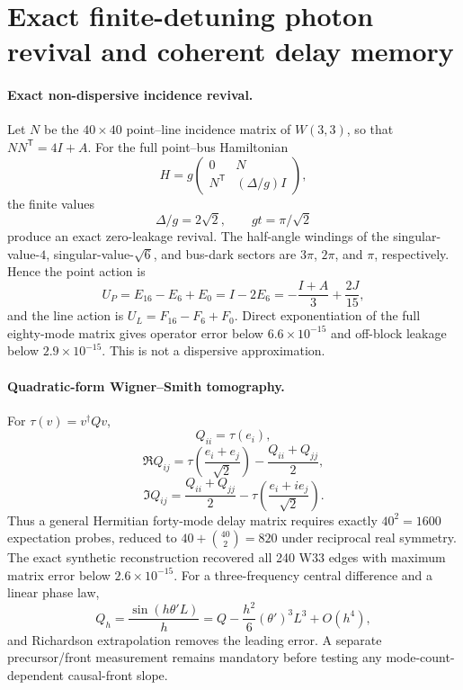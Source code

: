 \section{Exact finite-detuning photon revival and coherent delay memory}
\label{sec:bt4005-4012}

\paragraph{Exact non-dispersive incidence revival.}
Let $N$ be the $40\times40$ point--line incidence matrix of $W(3,3)$,
so that $NN^{\mathsf T}=4I+A$.  For the full point--bus Hamiltonian
\[
 H=g\begin{pmatrix}0&N\\N^{\mathsf T}&(\Delta/g)I\end{pmatrix},
\]
the finite values
\[
 \boxed{\Delta/g=2\sqrt2},\qquad
 \boxed{gt=\pi/\sqrt2}
\]
produce an exact zero-leakage revival.  The half-angle windings of the
singular-value-$4$, singular-value-$\sqrt6$, and bus-dark sectors are
$3\pi$, $2\pi$, and $\pi$, respectively.  Hence the point action is
\[
 \boxed{U_P=E_{16}-E_6+E_0
 =I-2E_6=-\frac{I+A}{3}+\frac{2J}{15}},
\]
and the line action is $U_L=F_{16}-F_6+F_0$.  Direct exponentiation of
the full eighty-mode matrix gives operator error below $6.6\times10^{-15}$
and off-block leakage below $2.9\times10^{-15}$.  This is not a
dispersive approximation.

\paragraph{Quadratic-form Wigner--Smith tomography.}
For $\tau(v)=v^\dagger Qv$,
\[
 Q_{ii}=\tau(e_i),
\]
\[
 \Re Q_{ij}=\tau\!\left(\frac{e_i+e_j}{\sqrt2}\right)
 -\frac{Q_{ii}+Q_{jj}}2,
\]
\[
 \Im Q_{ij}=\frac{Q_{ii}+Q_{jj}}2
 -\tau\!\left(\frac{e_i+i e_j}{\sqrt2}\right).
\]
Thus a general Hermitian forty-mode delay matrix requires exactly
$40^2=1600$ expectation probes, reduced to
$40+\binom{40}{2}=820$ under reciprocal real symmetry.  The exact
synthetic reconstruction recovered all 240 W33 edges with maximum
matrix error below $2.6\times10^{-15}$.  For a three-frequency central
difference and a linear phase law,
\[
 Q_h=\frac{\sin(h\theta' L)}h
 =Q-\frac{h^2}{6}(\theta')^3L^3+O(h^4),
\]
and Richardson extrapolation removes the leading error.  A separate
precursor/front measurement remains mandatory before testing any
mode-count-dependent causal-front slope.

